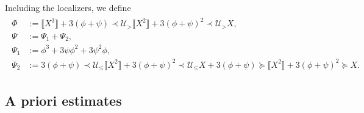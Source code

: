 \documentclass[a4paper,11pt]{article}
\numberwithin{equation}{section}
\newcommand{\UU}{\mathscr{U}}
\newcommand{\8}{\infty}
\begin{document}
Including the localizers, we define
\begin{align}\label{eq:44c}
\begin{aligned}
\Phi &:= \llbracket X^3 \rrbracket + 3 (\phi + \psi) \prec \UU_{>}
   \llbracket X^2 \rrbracket + 3 (\phi + \psi)^2 \prec \UU_{>} X,\\
    \Psi &:= \Psi_1 + \Psi_2, \\
     \Psi_1 &:= \phi^3 + 3 \psi \phi^2 + 3 \psi^2 \phi,\\
     \Psi_2 &:= 3 (\phi + \psi) \prec \UU_{\leqslant} \llbracket X^2
   \rrbracket + 3 (\phi + \psi)^2 \prec \UU_{\leqslant} X + 3 (\phi +
   \psi) \succcurlyeq \llbracket X^2 \rrbracket + 3 (\phi + \psi)^2
   \succcurlyeq X.
\end{aligned}
\end{align}   
 
\subsection{A priori estimates}
\label{ssec:apr}
 
\end{document}
